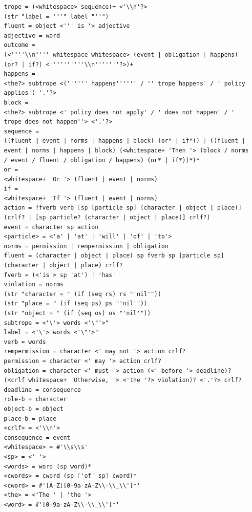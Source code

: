 \documentclass[11pt]{report}
\begin{document}
\begin{lstlisting}[showstringspaces=false,label={lst:ebnf2},caption={EBNF
grammar for the main trope definitions in TropICAL}]
trope = (<whitespace> sequence)+ <'\\n'?>
(str "label = '''" label "''")
fluent = object <''' is '> adjective
adjective = word
outcome =
(<''''\\n'''' whitespace whitespace> (event | obligation | happens) (or? | if?) <''''''''''\\n'''''''?>)+
happens =
<the?> subtrope <('''''' happens'''''' / '' trope happens' / ' policy applies') '.'?>
block =
<the?> subtrope <' policy does not apply' / ' does not happen' / ' trope does not happen''> <'.'?>
sequence =
((fluent | event | norms | happens | block) (or* | if*)) | ((fluent | event | norms | happens | block) (<whitespace+ 'Then '> (block / norms / event / fluent / obligation / happens) (or* | if*))*)*
or =
<whitespace+ 'Or '> (fluent | event | norms)
if =
<whitespace+ 'If '> (fluent | event | norms)
action = !fverb verb [sp [particle sp] (character | object | place)] (crlf? | [sp particle? (character | object | place)] crlf?)
event = character sp action
<particle> = <'a' | 'at' | 'will' | 'of' | 'to'>
norms = permission | rempermission | obligation
fluent = (character | object | place) sp fverb sp [particle sp] (character | object | place) crlf?
fverb = (<'is'> sp 'at') | 'has'
violation = norms
(str "character = " (if (seq rs) rs "'nil'"))
(str "place = " (if (seq ps) ps "'nil'"))
(str "object = " (if (seq os) os "'nil'"))
subtrope = <'\'> words <'\"'>"
label = <'\'> words <'\"'>"
verb = words
rempermission = character <' may not '> action crlf?
permission = character <' may '> action crlf?
obligation = character <' must '> action (<' before '> deadline)? (<crlf whitespace+ 'Otherwise, '> <'the '?> violation)? <'.'?> crlf?
deadline = consequence
role-b = character
object-b = object
place-b = place
<crlf> = <'\\n'>
consequence = event
<whitespace> = #'\\s\\s'
<sp> = <' '>
<words> = word (sp word)*
<cwords> = cword (sp ['of' sp] cword)*
<cword> = #'[A-Z][0-9a-zA-Z\\-\\_\\']*'
<the> = <'The ' | 'the '>
<word> = #'[0-9a-zA-Z\\-\\_\\']*'
\end{lstlisting}
\end{document}
